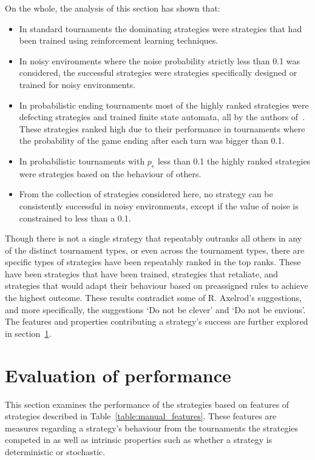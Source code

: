 On the whole, the analysis of this section has shown that:

\begin{itemize}
    \item In standard tournaments the dominating strategies were
    strategies that had been trained using reinforcement learning techniques.
    \item In noisy environments where the noise probability strictly less than
    0.1 was considered, the successful strategies were strategies specifically
    designed or trained for noisy environments.
    \item In probabilistic ending tournaments most of the highly ranked
    strategies were defecting strategies and trained finite state automata, all
    by the authors of~\cite{Ashlock2006, Ashlock2014}. These strategies ranked
    high due to their performance in tournaments where the probability of the
    game ending after each turn was bigger than 0.1.
    \item In probabilistic tournaments with \(p_e\) less than 0.1 the highly
    ranked strategies were strategies based on the behaviour of others.
    \item From the collection of strategies considered here,  no strategy can be
    consistently successful in noisy environments, except if the value of noise
    is constrained to less than a 0.1.
\end{itemize}

Though there is not a single strategy that repeatably outranks all others in any
of the distinct tournament types, or even across the tournament types, there
are specific types of strategies have been repeatably ranked in the top ranks.
These have been strategies that have been trained, strategies that retaliate,
and strategies that would adapt their behaviour based on preassigned rules
to achieve the highest outcome. These results contradict some of R. Axelrod's suggestions,
and more specifically, the suggestions `Do not be clever' and `Do not be envious'.
The features and properties contributing a strategy's success are further
explored in section~\ref{section:evaluation_of_performance}.

\section{Evaluation of performance}\label{section:evaluation_of_performance}

This section examines the performance of the strategies based on features of strategies described in
Table~\ref{table:manual_features}. These features are measures regarding a
strategy's behaviour from the tournaments the strategies competed in as well as
intrinsic properties such as whether a strategy is deterministic or stochastic.

